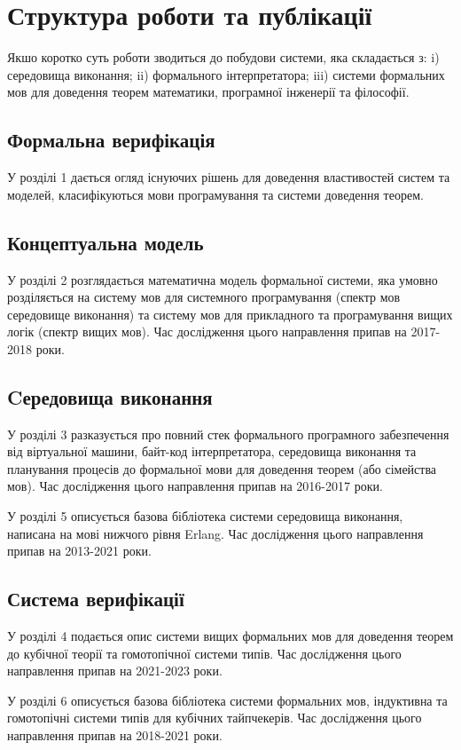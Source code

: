 \section{Структура роботи та публікації}
Якшо коротко суть роботи зводиться до побудови системи, яка складається з:
i) середовища виконання; ii) формального інтерпретатора; iii) системи формальних мов
для доведення теорем математики, програмної інженерії та філософії.

\subsection*{Формальна верифікація}
У розділі 1 дається огляд існуючих рішень для доведення
властивостей систем та моделей, класифікуються мови програмування
та системи доведення теорем.

\subsection*{Концептуальна модель}
У розділі 2 розглядається математична модель формальної системи,
яка умовно розділяється на систему мов для системного
програмування (спектр мов середовище виконання) та систему мов для
прикладного та програмування вищих логік (спектр вищих мов).
Час дослідження цього направлення припав на 2017-2018 роки.

\subsection*{Cередовища виконання}
У розділі 3 разказується про повний стек формального програмного забезпечення
від віртуальної машини, байт-код інтерпретатора, середовища виконання
та планування процесів до формальної мови для доведення теорем (або сімейства мов).
Час дослідження цього направлення припав на 2016-2017 роки.

У розділі 5 описується базова бібліотека системи середовища виконання,
написана на мові нижчого рівня Erlang.
Час дослідження цього направлення припав на 2013-2021 роки.

\subsection*{Система верифікації}
У розділі 4 подається опис системи вищих формальних мов для доведення теорем до
кубічної теорії та гомотопічної системи типів.
Час дослідження цього направлення припав на 2021-2023 роки.

У розділі 6 описується базова бібліотека системи формальних мов, індуктивна
та гомотопічні системи типів для кубічних тайпчекерів.
Час дослідження цього направлення припав на 2018-2021 роки.

